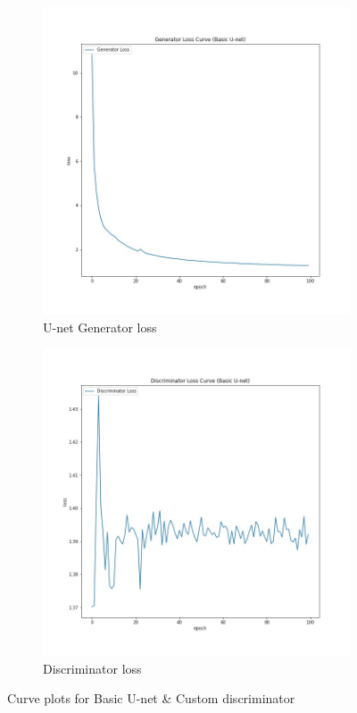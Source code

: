 \documentclass[oneside,a4paper,12pt]{report}
\begin{document}
\begin{figure}[!htb]
	\centering
	\begin{subfigure}[b]{0.3\textwidth}
		\centering
		\includegraphics[width=\textwidth]{figures/basic_generator_loss}
		\caption{U-net Generator loss}
		\label{fig: u-net_loss}
	\end{subfigure}
	\begin{subfigure}[b]{0.3\textwidth}
		\centering
		\includegraphics[width=\textwidth]{figures/basic_discriminator_loss}
		\caption{Discriminator loss}
		\label{fig: disc_cus_loss}
	\end{subfigure}
	\caption{Curve plots for Basic U-net \& Custom discriminator}
	\label{fig: basic_unet_curves}
\end{figure}
\end{document}
